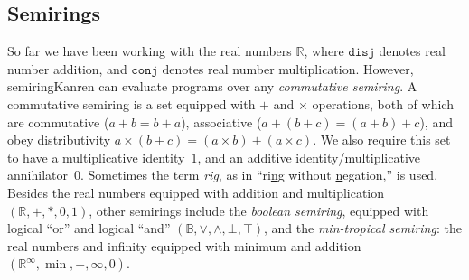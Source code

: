 \documentclass{report}
\theoremstyle{definition}
\begin{document}
\subsection{Semirings}

So far we have been working with the real numbers \(\mathbb{R}\), where \(\texttt{disj}\) denotes real number addition, and \(\texttt{conj}\) denotes real number multiplication.
However, semiringKanren can evaluate programs over any \emph{commutative semiring}.
A commutative semiring is a set equipped with \(+\) and \(\times\) operations,
both of which are commutative (\(a + b = b + a\)), associative (\(a + (b + c) = (a + b) + c\)), and obey distributivity \(a \times (b + c) = (a \times b) + (a \times c)\).
We also require this set to have a multiplicative identity~\(1\), and an additive identity/multiplicative annihilator~\(0\).
Sometimes the term \emph{rig}, as in ``ri\underline{n}g without \underline{n}egation,'' is used.
Besides the real numbers equipped with addition and multiplication \((\mathbb{R}, +, *,0,1)\),
other semirings include the \emph{boolean semiring}, equipped with logical ``or'' and logical ``and'' \((\mathbb{B},\vee,\wedge,\bot,\top)\),
and the \emph{min-tropical semiring}: the real numbers and infinity equipped with minimum and addition \((\mathbb{R}^{\infty},\min,+,\infty,0)\).
\end{document}
